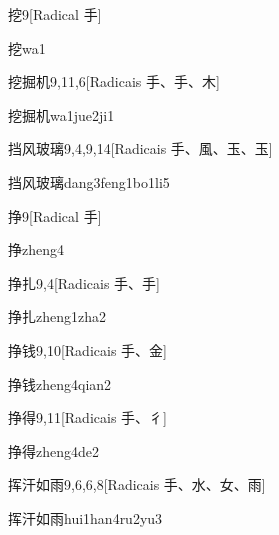 \begin{entry}{挖}{9}[Radical ⼿]
  \begin{phonetics}{挖}{wa1}
  \end{phonetics}
\end{entry}

\begin{entry}{挖掘机}{9,11,6}[Radicais ⼿、⼿、⽊]
  \begin{phonetics}{挖掘机}{wa1jue2ji1}
  \end{phonetics}
\end{entry}

\begin{entry}{挡风玻璃}{9,4,9,14}[Radicais ⼿、⾵、⽟、⽟]
  \begin{phonetics}{挡风玻璃}{dang3feng1bo1li5}
  \end{phonetics}
\end{entry}

\begin{entry}{挣}{9}[Radical ⼿]
  \begin{phonetics}{挣}{zheng4}
  \end{phonetics}
\end{entry}

\begin{entry}{挣扎}{9,4}[Radicais ⼿、⼿]
  \begin{phonetics}{挣扎}{zheng1zha2}
  \end{phonetics}
\end{entry}

\begin{entry}{挣钱}{9,10}[Radicais ⼿、⾦]
  \begin{phonetics}{挣钱}{zheng4qian2}
  \end{phonetics}
\end{entry}

\begin{entry}{挣得}{9,11}[Radicais ⼿、⼻]
  \begin{phonetics}{挣得}{zheng4de2}
  \end{phonetics}
\end{entry}

\begin{entry}{挥汗如雨}{9,6,6,8}[Radicais ⼿、⽔、⼥、⾬]
  \begin{phonetics}{挥汗如雨}{hui1han4ru2yu3}
  \end{phonetics}
\end{entry}

